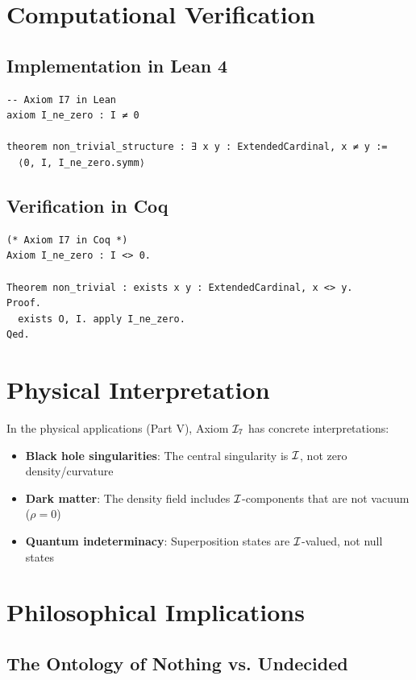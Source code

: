 \section{Computational Verification}

\subsection{Implementation in Lean 4}

\begin{verbatim}
-- Axiom I7 in Lean
axiom I_ne_zero : I ≠ 0

theorem non_trivial_structure : ∃ x y : ExtendedCardinal, x ≠ y :=
  ⟨0, I, I_ne_zero.symm⟩
\end{verbatim}

\subsection{Verification in Coq}

\begin{verbatim}
(* Axiom I7 in Coq *)
Axiom I_ne_zero : I <> 0.

Theorem non_trivial : exists x y : ExtendedCardinal, x <> y.
Proof.
  exists O, I. apply I_ne_zero.
Qed.
\end{verbatim}

\section{Physical Interpretation}

In the physical applications (Part V), Axiom $\mathcal{I}_7$ has concrete interpretations:

\begin{itemize}
    \item \textbf{Black hole singularities}: The central singularity is $\mathcal{I}$, not zero density/curvature
    \item \textbf{Dark matter}: The density field includes $\mathcal{I}$-components that are not vacuum ($\rho = 0$)
    \item \textbf{Quantum indeterminacy}: Superposition states are $\mathcal{I}$-valued, not null states
\end{itemize}

\section{Philosophical Implications}

\subsection{The Ontology of Nothing vs. Undecided}

